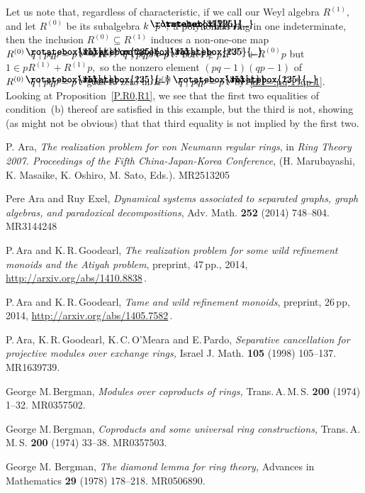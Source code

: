 \documentclass{amsart}
\DeclareRobustCommand{\lang}{\begin{picture}(5,7)
\put(1.2,2.5){\rotatebox{45}{\line(1,0){6.0}}}
\put(1.2,2.5){\rotatebox{315}{\line(1,0){6.0}}}
\end{picture}\kern.16em}
\DeclareRobustCommand{\rang}{\kern.1em\begin{picture}(5,7)
\put(.1,2.5){\rotatebox{135}{\line(1,0){6.0}}}
\put(.1,2.5){\rotatebox{225}{\line(1,0){6.0}}}
\end{picture}}
\begin{document}
Let us note that, regardless of characteristic, if we call
our Weyl algebra $R^{(1)},$ and let $R^{(0)}$ be its
subalgebra $k\lang p\rang,$ a polynomial ring in one indeterminate,
then the inclusion $R^{(0)}\subseteq R^{(1)}$ induces a non-one-one map
$R^{(0)}\lang q\mid pqp=p\rang\to R^{(1)}\lang q\mid pqp=p\rang.$
For $1\notin pR^{(0)}+R^{(0)}p$ but $1\in pR^{(1)}+ R^{(1)}p,$ so
the nonzero element $(pq-1)(qp-1)$ of $R^{(0)}\lang q\mid pqp=p\rang$
goes to zero in $R^{(1)}\lang q\mid pqp=p\rang$
by~\eqref{d.1=:pq-1*qp-1}.
Looking at Proposition~\ref{P.R0,R1}, we see that the first
two equalities of condition~(b) thereof are satisfied in this example,
but the third is not, showing (as might not be obvious) that that third equality is not implied by the first two.

\begin{thebibliography}{00}

 P. Ara,
{\em The realization problem for von Neumann regular rings}, in
{\em Ring Theory 2007. Proceedings of
the Fifth China-Japan-Korea Conference},
(H. Marubayashi, K. Masaike, K. Oshiro, M. Sato, Eds.).
MR2513205

 Pere Ara and Ruy Exel,
{\em Dynamical systems associated to separated graphs, graph algebras,
and paradoxical decompositions},
Adv. Math. {\bf 252} (2014) 748--804.
MR3144248

 P.\,Ara and K.\,R.\,Goodearl,
{\em The realization problem for some wild refinement monoids
and the Atiyah problem},
preprint, 47\,pp., 2014,
\url{http://arxiv.org/abs/1410.8838}\,.

 P.\,Ara and K.\,R.\,Goodearl,
{\em Tame and wild refinement monoids},
preprint, 26\,pp, 2014,
\url{http://arxiv.org/abs/1405.7582}\,.

 P.\,Ara, K.\,R.\,Goodearl, K.\,C.\,O'Meara and
E.\,Pardo,
{\em Separative cancellation for projective modules over exchange
rings,} Israel J. Math. {\bf 105} (1998) 105--137.
MR1639739.

 George M.\,Bergman,
{\em Modules over coproducts of rings,}
Trans.\,A.\,M.\,S. {\bf 200} (1974) 1--32.
MR0357502.

 George M.\,Bergman,
{\em Coproducts and some universal ring constructions,}
Trans.\,A.\,M.\,S. {\bf 200} (1974) 33--38.
MR0357503.

\bibitem{<>} George M. Bergman,
\emph{The diamond lemma for ring theory,}
Advances in Mathematics {\bf 29} (1978) 178--218.
MR0506890.


\end{thebibliography}
\end{document}
